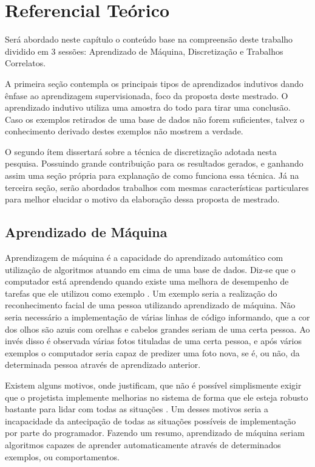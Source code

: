 \chapter{Referencial Teórico}\label{cap:refTeor}



Será abordado neste capítulo o conteúdo base na compreensão deste trabalho dividido em 3 sessões: Aprendizado de Máquina, Discretização e Trabalhos Correlatos. 

A primeira seção contempla os principais tipos de aprendizados indutivos  dando ênfase ao aprendizagem supervisionada, foco da proposta deste mestrado. O aprendizado indutivo utiliza uma amostra do todo para tirar uma conclusão. Caso os exemplos retirados de uma base de dados não forem suficientes, talvez o conhecimento derivado destes exemplos não mostrem a verdade. 

O segundo ítem dissertará sobre a técnica de discretização adotada nesta pesquisa. Possuindo grande contribuição para os resultados gerados, e ganhando assim uma seção própria para explanação de como funciona essa técnica. Já na terceira seção, serão abordados trabalhos com mesmas características particulares para melhor elucidar o motivo da elaboração dessa proposta de mestrado.



\section{Aprendizado de Máquina}\label{cap:refTeor:sec:aprendMaq}

Aprendizagem de máquina é a capacidade do aprendizado automático com utilização de algoritmos atuando em cima de uma base de dados.  Diz-se que o computador está aprendendo quando existe uma melhora de desempenho de tarefas que ele utilizou como exemplo \cite{Mitchell1997}. Um exemplo seria a realização do reconhecimento facial de uma pessoa utilizando aprendizado de máquina. Não seria necessário a implementação de várias linhas de código informando, que a cor dos olhos são azuis com orelhas e cabelos grandes seriam de uma certa pessoa. Ao invés disso é observada várias fotos tituladas de uma certa pessoa, e após vários exemplos o computador seria capaz de predizer uma foto nova, se é, ou não, da determinada pessoa através de aprendizado anterior.

Existem alguns motivos, onde justificam, que não é possível simplismente exigir que o projetista implemente melhorias no sistema de forma que ele esteja robusto bastante para lidar com todas as situações \cite{RusselStuart.Norvig2013}. Um  desses motivos seria a incapacidade da antecipação de  todas as situações possíveis de implementação por parte do programador. Fazendo um resumo, aprendizado de máquina seriam algoritmos capazes de aprender automaticamente através de  determinados exemplos, ou comportamentos. 

